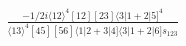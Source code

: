 \documentclass[varwidth, border=5pt]{standalone}
\begin{document}
\begin{my}
$\begin{gathered}
\scriptscriptstyle\frac{-1/2i⟨12⟩^4[12][23]⟨3|1+2|5]^4}{⟨13⟩^4[45][56]⟨1|2+3|4]⟨3|1+2|6]s_{123}}
\end{gathered}$
\end{my}
\end{document}
